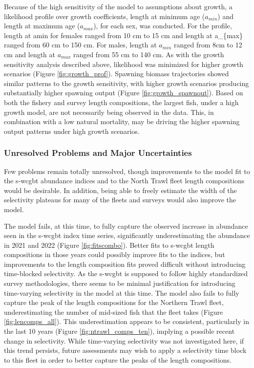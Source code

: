 \documentclass[11pt,
  english,
  letterpaper,
]{article}
\begin{document}
Because of the high sensitivity of the model to assumptions about growth, a likelihood profile over growth coefficients, length at minimum age (\(a_{min}\)) and length at maximum age (\(a_{max}\)), for each sex, was conducted. For the profile, length at amin for females ranged from 10 cm to 15 cm and length at a\_\{max\} ranged from 60 cm to 150 cm. For males, length at \(a_{min}\) ranged from 8cm to 12 cm and length at \(a_{max}\) ranged from 55 cm to 140 cm. As with the growth sensitivity analysis described above, likelihood was minimized for higher growth scenarios (Figure \ref{fig:growth_prof}). Spawning biomass trajectories showed similar patterns to the growth sensitivity, with higher growth scenarios producing substantially higher spawning output (Figure \ref{fig:growth_spawnout}). Based on both the fishery and survey length compositions, the largest fish, under a high growth model, are not necessarily being observed in the data. This, in combination with a low natural mortality, may be driving the higher spawning output patterns under high growth scenarios.

\hypertarget{unresolved-problems-and-major-uncertainties-1}{%
\subsubsection{Unresolved Problems and Major Uncertainties}\label{unresolved-problems-and-major-uncertainties-1}}

Few problems remain totally unresolved, though improvements to the model fit to the \gls{s-wcgbt} abundance indices and to the North Trawl fleet length compositions would be desirable. In addition, being able to freely estimate the width of the selectivity plateaus for many of the fleets and surveys would also improve the model.

The model fails, at this time, to fully capture the observed increase in abundance seen in the \gls{s-wcgbt} index time series, significantly underestimating the abundance in 2021 and 2022 (Figure \ref{fig:fitscombo}). Better fits to \gls{s-wcgbt} length compositions in those years could possibly improve fits to the indices, but improvements to the length composition fits proved difficult without introducing time-blocked selectivity. As the \gls{s-wcgbt} is supposed to follow highly standardized survey methodologies, there seems to be minimal justification for introducing time-varying selectivity in the model at this time. The model also fails to fully capture the peak of the length compositions for the Northern Trawl fleet, underestimating the number of mid-sized fish that the fleet takes (Figure \ref{fig:lencomps_all}). This underestimation appears to be consistent, particularly in the last 10 years (Figure \ref{fig:ntrawl_comps_ten}), implying a possible recent change in selectivity. While time-varying selectivity was not investigated here, if this trend persists, future assessments may wish to apply a selectivity time block to this fleet in order to better capture the peaks of the length compositions.
\end{document}
